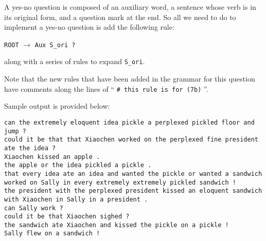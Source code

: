 \documentclass[11pt]{article}
\newcommand{\code}[1]{\texttt{#1}}
\begin{document}
\begin{enumerate}
	A yes-no question is composed of an auxiliary word, a sentence whose verb is in its original form, and a question mark at the end. So all we need to do to implement a yes-no question is add the following rule:
\begin{center}
	\code{ROOT} $\to$ \code{Aux S\_ori ?}
\end{center}
along with a series of rules to expand \code{S\_ori}.

Note that the new rules that have been added in the grammar for this question have comments along the lines of `` \code{\# this rule is for (7b)} ''.
\end{enumerate}
Sample output is provided below:
\begin{lstlisting}
can the extremely eloquent idea pickle a perplexed pickled floor and jump ?
could it be that that Xiaochen worked on the perplexed fine president ate the idea ?
Xiaochen kissed an apple .
the apple or the idea pickled a pickle .
that every idea ate an idea and wanted the pickle or wanted a sandwich worked on Sally in every extremely extremely pickled sandwich !
the president with the perplexed president kissed an eloquent sandwich with Xiaochen in Sally in a president .
can Sally work ?
could it be that Xiaochen sighed ?
the sandwich ate Xiaochen and kissed the pickle on a pickle !
Sally flew on a sandwich !
\end{lstlisting}
\end{document}
